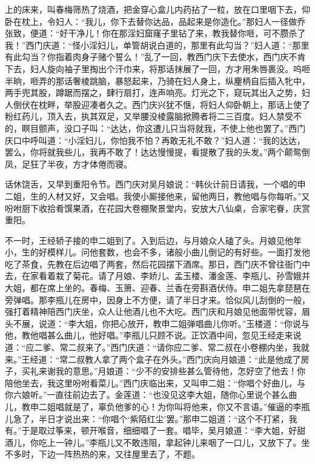 上的床来，叫春梅筛热了烧酒，把金穿心盒儿内药拈了一粒，放在口里咽下去，仰卧在枕上，令妇人：“我儿，你下去替你达品，品起来是你造化。”那妇人一径做乔张致，便道：“好干净儿！你在那淫妇窟窿子里钻了来，教我替你咂，可不臜杀了我！”西门庆道：“怪小淫妇儿，单管胡说白道的，那里有此勾当？”妇人道：“那里有此勾当？你指着肉身子赌个誓么！”乱了一回，教西门庆下去使水，西门庆不肯下去，妇人旋向袖子里掏出个汗巾来，将那话抹展了一回，方才用朱唇裹没。呜咂半晌，咂弄的那话奢棱跳脑，暴怒起来，乃骑在妇人身上，纵麈柄自后插入牝中，两手兜其股，蹲踞而摆之，肆行扇打，连声响亮。灯光之下，窥玩其出入之势，妇人倒伏在枕畔，举股迎凑者久之。西门庆兴犹不惬，将妇人仰卧朝上，那话上使了粉红药儿，顶入去，执其双足，又举腰没棱露脑掀腾者将二三百度。妇人禁受不的，瞑目颤声，没口子叫：“达达，你这遭儿只当将就我，不使上他也罢了。”西门庆口中呼叫道：“小淫妇儿，你怕我不怕？再敢无礼不敢？”妇人道：“我的达达，罢么，你将就我些儿，我再不敢了！达达慢慢提，看提散了我的头发。”两个颠鸳倒凤，足狂了半夜，方才体倦而寝。

话休饶舌，又早到重阳令节。西门庆对吴月娘说：“韩伙计前日请我，一个唱的申二姐，生的人材又好，又会唱。我使小厮接他来，留他两日，教他唱与你每听。”又吩咐厨下收拾肴馔果酒，在花园大卷棚聚景堂内，安放大八仙桌，合家宅眷，庆赏重阳。

不一时，王经轿子接的申二姐到了。入到后边，与月娘众人磕了头。月娘见他年小，生的好模样儿。问他套数，也会不多，诸般小曲儿倒记的有好些。一面打发他吃了茶食，先教在后边唱了两套，然后花园摆下酒席。那日，西门庆不曾往衙门中去，在家看着栽了菊花。请了月娘、李娇儿、孟玉楼、潘金莲、李瓶儿、孙雪娥并大姐，都在席上坐的。春梅、玉箫、迎春、兰香在旁斟酒伏侍。申二姐先拿琵琶在旁弹唱。那李瓶儿在房中，因身上不方便，请了半日才来。恰似风儿刮倒的一般，强打着精神陪西门庆坐，众人让他酒儿也不大吃。西门庆和月娘见他面带忧容，眉头不展，说道：“李大姐，你把心放开，教申二姐弹唱曲儿你听。”玉楼道：“你说与他，教他唱甚么曲儿，他好唱。”李瓶儿只顾不说。正饮酒中间，忽见王经走来说道：“应二爹、常二叔来了。”西门庆道：“请你应二爹、常二叔在小卷棚内坐，我就来。”王经道：“常二叔教人拿了两个盒子在外头。”西门庆向月娘道：“此是他成了房子，买礼来谢我的意思。”月娘道：“少不的安排些甚么管待他，怎好空了他去！你陪他坐去，我这里吩咐看菜儿。”西门庆临出来，又叫申二姐：“你唱个好曲儿，与你六娘听。”一直往前边去了。金莲道：“也没见这李大姐，随你心里说个甚么曲儿，教申二姐唱就是了，辜负他爹的心！为你叫将他来，你又不言语。”催逼的李瓶儿急了，半日才说出来：“你唱个‘紫陌红尘’罢。”那申二姐道：“这个不打紧，我有。”于是取过筝来，顿开喉音，细细唱了一套。唱毕，吴月娘道：“李大姐，好甜酒儿，你吃上一钟儿。”李瓶儿又不敢违阻，拿起钟儿来咽了一口儿，又放下了。坐不多时，下边一阵热热的来，又往屋里去了，不题。

